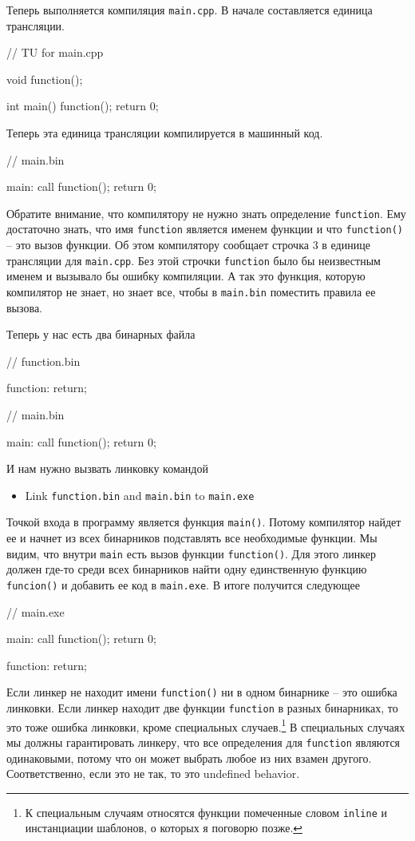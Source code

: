 \documentclass{article}
\begin{document}
Теперь выполняется компиляция \verb"main.cpp". В начале составляется единица трансляции.
\begin{cppcode}
// TU for main.cpp

void function();

int main() {
  function();
  return 0;
}
\end{cppcode}
Теперь эта единица трансляции компилируется в машинный код.
\begin{cppcode}
// main.bin

main:
  call function();
  return 0;
\end{cppcode}

Обратите внимание, что компилятору не нужно знать определение \verb"function". Ему достаточно знать, что имя \verb"function" является именем функции и что \verb"function()" -- это вызов функции. Об этом компилятору сообщает строчка $3$ в единице трансляции для \verb"main.cpp". Без этой строчки \verb"function" было бы неизвестным именем и вызывало бы ошибку компиляции. А так это функция, которую компилятор не знает, но знает все, чтобы в \verb"main.bin" поместить правила ее вызова.

Теперь у нас есть два бинарных файла
\begin{cppcode}
// function.bin

function:
  return;
  
// main.bin

main:
  call function();
  return 0;
\end{cppcode}
И нам нужно вызвать линковку командой
\begin{itemize}
\item Link \verb"function.bin" and \verb"main.bin" to \verb"main.exe"
\end{itemize}
Точкой входа в программу является функция \verb"main()". Потому компилятор найдет ее и начнет из всех бинарников подставлять все необходимые функции. Мы видим, что внутри \verb"main" есть вызов функции \verb"function()". Для этого линкер должен где-то среди всех бинарников найти одну единственную функцию \verb"funcion()" и добавить ее код в \verb"main.exe". В итоге получится следующее
\begin{cppcode}
// main.exe

main:
  call function();
  return 0;
  
function:
  return;
\end{cppcode}
Если линкер не находит имени \verb"function()" ни в одном бинарнике -- это ошибка линковки. Если линкер находит две функции \verb"function" в разных бинарниках, то это тоже ошибка линковки, кроме специальных случаев.\footnote{К специальным случаям относятся функции помеченные словом \verb"inline" и инстанциации шаблонов, о которых я поговорю позже.} В специальных случаях мы должны гарантировать линкеру, что все определения для \verb"function" являются одинаковыми, потому что он может выбрать любое из них взамен другого. Соответственно, если это не так, то это undefined behavior.
\end{document}

